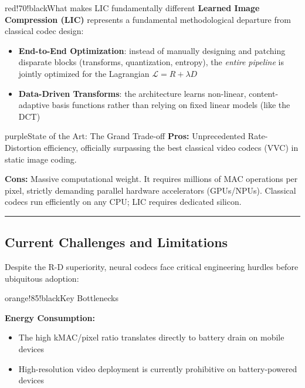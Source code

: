 \begin{calloutbox}{red!70!black}{What makes LIC fundamentally different}
\textbf{Learned Image Compression (LIC)} represents a fundamental methodological departure from classical codec design:

\begin{itemize}
\item \textbf{End-to-End Optimization}: instead of manually designing and patching disparate blocks (transforms, quantization, entropy), the \textit{entire pipeline} is jointly optimized for the Lagrangian $\mathcal{L} = R + \lambda D$
\end{itemize}

\begin{itemize}
\item \textbf{Data-Driven Transforms}: the architecture learns non-linear, content-adaptive basis functions rather than relying on fixed linear models (like the DCT)
\end{itemize}
\end{calloutbox}

\begin{calloutbox}{purple}{State of the Art: The Grand Trade-off}
\textbf{Pros:} Unprecedented Rate-Distortion efficiency, officially surpassing the best classical video codecs (VVC) in static image coding.

\textbf{Cons:} Massive computational weight. It requires millions of MAC operations per pixel, strictly demanding parallel hardware accelerators (GPUs/NPUs). Classical codecs run efficiently on any CPU; LIC requires dedicated silicon.
\end{calloutbox}

\bigskip\hrule\bigskip

\subsection{Current Challenges and Limitations}

Despite the R-D superiority, neural codecs face critical engineering hurdles before ubiquitous adoption:

\begin{calloutbox}{orange!85!black}{Key Bottlenecks}

\end{calloutbox}

\textbf{Energy Consumption:}
\begin{itemize}
\item The high kMAC/pixel ratio translates directly to battery drain on mobile devices
\item High-resolution video deployment is currently prohibitive on battery-powered devices
\end{itemize}

